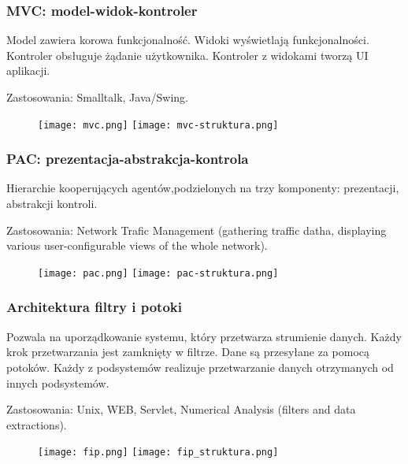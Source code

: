 \documentclass[../main.tex]{subfiles}
\begin{document}
    \subsubsection{MVC: model-widok-kontroler}
    Model zawiera korowa funkcjonalność. Widoki wyświetlają funkcjonalności. Kontroler obsługuje żądanie użytkownika. Kontroler z widokami tworzą UI aplikacji.

    Zastosowania: Smalltalk, Java/Swing.

    \begin{figure}[H]
        \texttt{[image: mvc.png]}
        \texttt{[image: mvc-struktura.png]}
    \end{figure}



    \subsubsection{PAC: prezentacja-abstrakcja-kontrola}
    Hierarchie kooperujących agentów,podzielonych na trzy komponenty: prezentacji, abstrakcji kontroli.

    Zastosowania: Network Trafic Management (gathering traffic datha, displaying various user-configurable
    views of the whole network).

    \begin{figure}[h]
        \texttt{[image: pac.png]}
        \texttt{[image: pac-struktura.png]}
    \end{figure}



    \subsubsection{Architektura filtry i potoki}

    Pozwala na uporządkowanie systemu, który przetwarza strumienie danych. Każdy krok przetwarzania jest zamknięty w filtrze.
    Dane są przesyłane za pomocą potoków. Każdy z podsystemów realizuje przetwarzanie danych otrzymanych od innych podsystemów.

    Zastosowania: Unix, WEB, Servlet, Numerical Analysis (filters and data extractions).

    \begin{figure}[h]
        \texttt{[image: fip.png]}
        \texttt{[image: fip\_struktura.png]}
    \end{figure}
\end{document}
